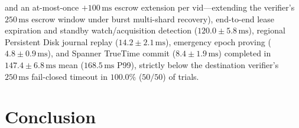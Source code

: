 \documentclass[conference,10pt]{IEEEtran}
\begin{document}
{\begin{enumerate}
and an at-most-once $+100\,\text{ms}$ escrow extension per $\text{vid}$---extending the verifier's $250\,\text{ms}$ escrow window under burst multi-shard recovery), end-to-end lease expiration and standby watch/acquisition detection ($120.0 \pm 5.8\,\text{ms}$), regional Persistent Disk journal replay ($14.2 \pm 2.1\,\text{ms}$), emergency epoch proving ($4.8 \pm 0.9\,\text{ms}$), and Spanner TrueTime commit ($8.4 \pm 1.9\,\text{ms}$) completed in $147.4 \pm 6.8\,\text{ms}$ mean ($168.5\,\text{ms}$ P99), strictly below the destination verifier's $250\,\text{ms}$ fail-closed timeout in $100.0\%$ ($50/50$) of trials.
\end{enumerate}\par}

\section{Conclusion}
\end{document}
